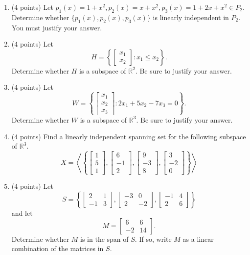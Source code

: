\documentclass[11pt]{article}
\theoremstyle{definition}
\begin{document}
\begin{enumerate}
\begin{enumerate}
\end{enumerate}

\item (4 points) Let $p_1(x)=1+x^2, p_2(x)=x+x^2, p_3(x)=1+2x+x^2 \in P_2$.  Determine whether $\{p_1(x), p_2(x), p_3(x)\}$ is linearly independent in $P_2$.  You must justify your answer.

\item (4 points) Let
	\[
	H=\left\{\begin{bmatrix}x_{1}\\ x_{2}\end{bmatrix}: x_{1}\leq x_{2}\right\}.
	\]
Determine whether $H$ is a subspace of $\mathbb{R}^{2}$.  Be sure to justify your answer.

\item (4 points) Let
	\[
	W=\left\{\begin{bmatrix}x_{1}\\ x_{2}\\x_3\end{bmatrix}: 2x_{1}+5x_2-7x_3=0\right\}.
	\]
Determine whether $W$ is a subspace of $\mathbb{R}^{3}$.  Be sure to justify your answer.

\item (4 points) Find a linearly independent spanning set for the following subspace of $\mathbb{R}^3$.
	\[
	X=\left\langle \left\{\begin{bmatrix}1\\ 5\\1\end{bmatrix}, \begin{bmatrix}6\\ -1\\2\end{bmatrix}, \begin{bmatrix}9\\ -3\\8\end{bmatrix}, \begin{bmatrix}3\\ -2\\0\end{bmatrix}\right\}\right\rangle
	\]

\item (4 points) Let
	\[
	S=\left\{\begin{bmatrix}2 & 1\\ -1 & 3\end{bmatrix}, \begin{bmatrix}-3 & 0\\ 2 & -2\end{bmatrix}, \begin{bmatrix}-1 & 4\\ 2 & 6\end{bmatrix}\right\}
	\]
and let
	\[
	M=\begin{bmatrix}6 & 6\\-2 & 14\end{bmatrix}.
	\]
Determine whether $M$ is in the span of $S$.  If so, write $M$ as a linear combination of the matrices in $S$.


\end{enumerate}
\end{document}
